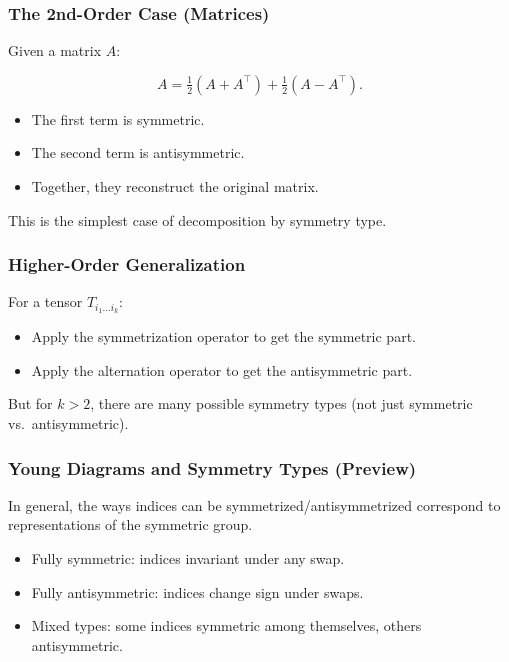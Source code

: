 \documentclass[
  letterpaper,
  DIV=11,
  numbers=noendperiod]{scrreprt}
\providecommand{\tightlist}{%
  \setlength{\itemsep}{0pt}\setlength{\parskip}{0pt}}
\begin{document}
\subsubsection{The 2nd-Order Case
(Matrices)}\label{the-2nd-order-case-matrices}

Given a matrix \(A\):

\[
A = \tfrac{1}{2}(A + A^\top) + \tfrac{1}{2}(A - A^\top).
\]

\begin{itemize}
\tightlist
\item
  The first term is symmetric.
\item
  The second term is antisymmetric.
\item
  Together, they reconstruct the original matrix.
\end{itemize}

This is the simplest case of decomposition by symmetry type.

\subsubsection{Higher-Order
Generalization}\label{higher-order-generalization}

For a tensor \(T_{i_1 \dots i_k}\):

\begin{itemize}
\tightlist
\item
  Apply the symmetrization operator to get the symmetric part.
\item
  Apply the alternation operator to get the antisymmetric part.
\end{itemize}

But for \(k > 2\), there are many possible symmetry types (not just
symmetric vs.~antisymmetric).

\subsubsection{Young Diagrams and Symmetry Types
(Preview)}\label{young-diagrams-and-symmetry-types-preview}

In general, the ways indices can be symmetrized/antisymmetrized
correspond to representations of the symmetric group.

\begin{itemize}
\tightlist
\item
  Fully symmetric: indices invariant under any swap.
\item
  Fully antisymmetric: indices change sign under swaps.
\item
  Mixed types: some indices symmetric among themselves, others
  antisymmetric.
\end{itemize}
\end{document}
